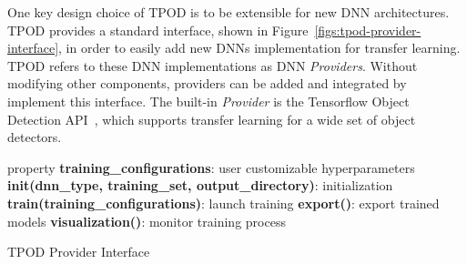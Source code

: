 One key design choice of TPOD is to be extensible for new DNN architectures.
TPOD provides a standard interface, shown in
Figure~\ref{figs:tpod-provider-interface}, in order to easily add new DNNs
implementation for transfer learning. TPOD refers to these DNN implementations
as DNN \textit{Providers}. Without modifying other components, providers can be
added and integrated by implement this interface. The built-in \textit{Provider}
is the Tensorflow Object Detection API~\cite{tfod2019}, which supports transfer
learning for a wide set of object detectors. 


\begin{algorithm} 
\SetAlgoLined
 property \textbf{training\_configurations}: user customizable hyperparameters\;
 \textbf{init(dnn\_type, training\_set, output\_directory)}: initialization\;
 \textbf{train(training\_configurations)}: launch training\;
 \textbf{export()}: export trained models\;
 \textbf{visualization()}: monitor training process\;
\caption{TPOD Provider Interface}
\label{figs:tpod-provider-interface}
\end{algorithm}